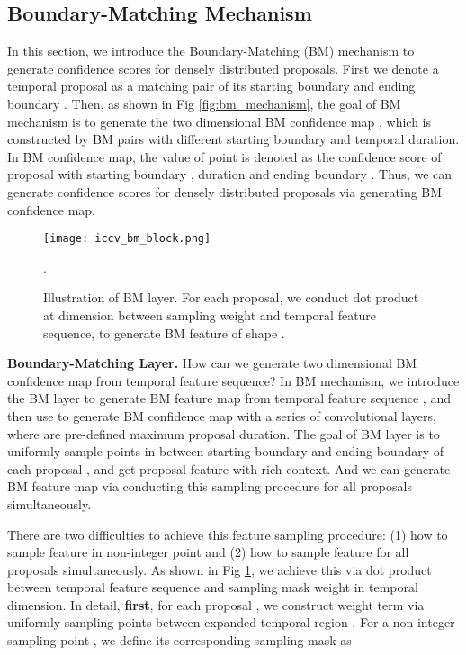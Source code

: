 \documentclass[10pt,twocolumn,letterpaper]{article}
\begin{document}
\subsection{Boundary-Matching Mechanism}

In this section, we introduce the Boundary-Matching (BM) mechanism to generate confidence scores for densely distributed proposals. 
First we denote a temporal proposal  as a matching pair of its starting boundary  and  ending boundary . 
Then, as shown in Fig \ref{fig:bm_mechanism}, the goal of BM mechanism is to generate the two dimensional BM confidence map , which is constructed by BM pairs with different starting boundary and temporal duration.
In BM confidence map, the value of point  is denoted as the confidence score of  proposal  with starting boundary , duration  and ending boundary  . 
Thus, we can generate confidence scores for densely distributed proposals via generating BM confidence map.


\begin{figure}[t]
\begin{center}
\begin{minipage}[b]{1.0\linewidth}
  \centering
  \centerline{\texttt{[image: iccv\_bm\_block.png]}}
  \medskip
\end{minipage}
\end{center}
   \caption{Illustration of BM layer. For each proposal, we conduct dot product at  dimension between sampling weight and temporal feature sequence, to generate BM feature of shape .}.
   \label{fig:bm_layer}
\end{figure}




\noindent
\textbf{Boundary-Matching Layer.} 
How can we generate two dimensional BM confidence map from temporal feature sequence?
In BM mechanism, we introduce the BM layer to generate BM feature map  from temporal feature sequence , and then use  to generate BM confidence map  with a series of convolutional layers, where  are pre-defined maximum proposal duration.
The goal of BM layer is to uniformly sample  points in  between starting boundary  and ending boundary  of each proposal , and get proposal feature  with rich context.
And we can generate BM feature map  via conducting this sampling procedure for all proposals simultaneously.



There are two difficulties to achieve this feature sampling procedure: (1) how to sample feature in non-integer point and (2) how to sample feature for all proposals simultaneously.
As shown in Fig \ref{fig:bm_layer}, we achieve this via dot product between temporal feature sequence  and sampling mask weight   in temporal dimension.
In detail, \textbf{first}, for each proposal , we construct  weight term  via uniformly sampling  points between expanded temporal region . 
For a non-integer sampling point , we define its corresponding sampling mask  as
\end{document}
